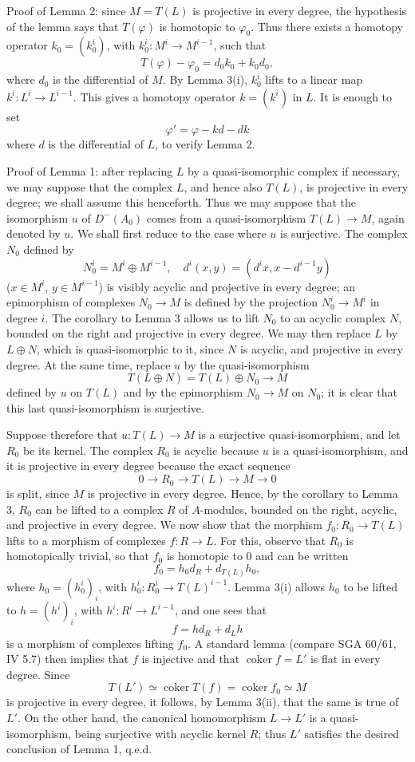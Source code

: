 \documentclass[11pt]{article}
\providecommand{\coker}{\operatorname{coker}}
\providecommand{\coker}{\operatorname{Coker}}
\begin{document}
Proof of Lemma 2: since $M=T(L)$ is projective in every degree, the hypothesis of the lemma says that $T(\varphi)$ is homotopic to $\varphi_0$. Thus there exists a homotopy operator $k_0=(k_0^i)$, with $k_0^i:M^i\to M^{i-1}$, such that
\[
T(\varphi)-\varphi_0=d_0k_0+k_0d_0,
\]
where $d_0$ is the differential of $M$. By Lemma 3(i), $k_0^i$ lifts to a linear map $k^i:L^i\to L^{i-1}$. This gives a homotopy operator $k=(k^i)$ in $L$. It is enough to set
\[
\varphi'=\varphi-kd-dk
\]
where $d$ is the differential of $L$, to verify Lemma 2.

Proof of Lemma 1: after replacing $L$ by a quasi-isomorphic complex if necessary, we may suppose that the complex $L$, and hence also $T(L)$, is projective in every degree; we shall assume this henceforth. Thus we may suppose that the isomorphism $u$ of $D^-(A_0)$ comes from a quasi-isomorphism $T(L)\to M$, again denoted by $u$. We shall first reduce to the case where $u$ is surjective. The complex $N_0$ defined by
\[
N_0^i=M^i\oplus M^{i-1},
\quad
 d^i(x,y)=(d^i x,x-d^{i-1}y)
\]
($x\in M^i$, $y\in M^{i-1}$) is visibly acyclic and projective in every degree; an epimorphism of complexes $N_0\to M$ is defined by the projection $N_0^i\to M^i$ in degree $i$. The corollary to Lemma 3 allows us to lift $N_0$ to an acyclic complex $N$, bounded on the right and projective in every degree. We may then replace $L$ by $L\oplus N$, which is quasi-isomorphic to it, since $N$ is acyclic, and projective in every degree. At the same time, replace $u$ by the quasi-isomorphism
\[
T(L\oplus N)=T(L)\oplus N_0\longrightarrow M
\]
defined by $u$ on $T(L)$ and by the epimorphism $N_0\to M$ on $N_0$; it is clear that this last quasi-isomorphism is surjective.

Suppose therefore that $u:T(L)\to M$ is a surjective quasi-isomorphism, and let $R_0$ be its kernel. The complex $R_0$ is acyclic because $u$ is a quasi-isomorphism, and it is projective in every degree because the exact sequence
\[
0\longrightarrow R_0\longrightarrow T(L)\longrightarrow M\longrightarrow0
\]
is split, since $M$ is projective in every degree. Hence, by the corollary to Lemma 3, $R_0$ can be lifted to a complex $R$ of $A$-modules, bounded on the right, acyclic, and projective in every degree. We now show that the morphism $f_0:R_0\to T(L)$ lifts to a morphism of complexes $f:R\to L$. For this, observe that $R_0$ is homotopically trivial, so that $f_0$ is homotopic to $0$ and can be written
\[
f_0=h_0d_R+d_{T(L)}h_0,
\]
where $h_0=(h_0^i)_i$, with $h_0^i:R_0^i\to T(L)^{i-1}$. Lemma 3(i) allows $h_0$ to be lifted to $h=(h^i)_i$, with $h^i:R^i\to L^{i-1}$, and one sees that
\[
f=hd_R+d_Lh
\]
is a morphism of complexes lifting $f_0$. A standard lemma (compare SGA 60/61, IV 5.7) then implies that $f$ is injective and that $\coker f=L'$ is flat in every degree. Since
\[
T(L')\simeq\coker T(f)=\coker f_0\simeq M
\]
is projective in every degree, it follows, by Lemma 3(ii), that the same is true of $L'$. On the other hand, the canonical homomorphism $L\to L'$ is a quasi-isomorphism, being surjective with acyclic kernel $R$; thus $L'$ satisfies the desired conclusion of Lemma 1, q.e.d.
\end{document}
